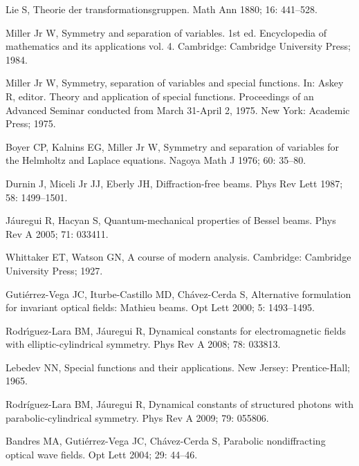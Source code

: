 \documentclass[12pt]{iopart}
\begin{document}
\begin{thebibliography}{100}
	 Lie S,
	Theorie der transformationsgruppen.
	Math Ann 1880;  16: 441--528.

	 Miller Jr W,
	Symmetry and separation of variables. 1st ed.
	Encyclopedia of mathematics and its applications vol. 4. Cambridge: Cambridge University Press; 1984.


	 Miller Jr W,
	Symmetry, separation of variables and special functions.
	In: Askey R, editor. Theory and application of special functions. Proceedings of an Advanced Seminar conducted from March 31-April 2, 1975. New York: Academic Press; 1975.

	


	 Boyer CP, Kalnins EG, Miller Jr W,
	Symmetry and separation of variables for the Helmholtz and Laplace equations.
	Nagoya Math J 1976;  60:  35--80.
	
	
	
	
	 Durnin J, Miceli Jr JJ, Eberly JH,
	Diffraction-free beams.
	Phys Rev Lett 1987;  58: 1499--1501.
	
	 J{\'a}uregui R, Hacyan S,
	Quantum-mechanical properties of Bessel beams.
	Phys Rev A 2005;  71: 033411.
	
	 Whittaker ET, Watson GN,
	A course of modern analysis. Cambridge: Cambridge University Press; 1927.
	
	 Guti{\'e}rrez-Vega JC, Iturbe-Castillo MD, Ch{\'a}vez-Cerda S,
	Alternative formulation for invariant optical fields: Mathieu beams.
	Opt Lett 2000; 5: 1493--1495.
	
	 Rodr{\'\i}guez-Lara BM, J{\'a}uregui R,
	Dynamical constants for electromagnetic fields with elliptic-cylindrical symmetry.
	Phys Rev A 2008; 78: 033813.
	
	 Lebedev NN,
	Special functions and their applications. New Jersey: Prentice-Hall; 1965.
	
	 Rodr{\'i}guez-Lara BM, J{\'a}uregui R,
	Dynamical constants of structured photons with parabolic-cylindrical symmetry.
	Phys Rev A 2009; 79: 055806.
	
	 Bandres MA, Guti{\'e}rrez-Vega JC, Ch{\'a}vez-Cerda S,
	Parabolic nondiffracting optical wave fields.
	Opt Lett 2004; 29: 44--46.
	

\end{thebibliography}
\end{document}
